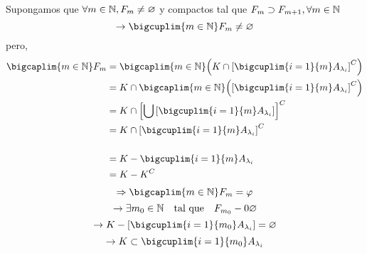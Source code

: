   Supongamos que $\forall m \in \mathbb{N}, F_m \neq \varnothing $ y compactos tal que $F_m \supset F_{m+1}, \forall m \in \mathbb{N}$
  $$
  \rightarrow \bigcuplim{m \in \N} F_m  \neq \varnothing
  $$
  pero, 
  \begin{align*}
  	\bigcaplim{m \in \N} F_m & = \bigcaplim{m \in \N} \pqty{K \cap  \bqty{\bigcuplim{i = 1}{m} A_{\lambda_i}}^C }\\
  	 &=K \cap \bigcaplim{m \in \N} \pqty{   \bqty{\bigcuplim{i = 1}{m} A_{\lambda_i}}^C }\\
  	 &=K \cap   \bqty{ \bigcup   \bqty{\bigcuplim{i = 1}{m} A_{\lambda_i}} }^C\\
  	 &=K \cap   \bqty{    \bigcuplim{i = 1}{m} A_{\lambda_i} }^C\\\\
  	 &=K - \bigcuplim{i = 1}{m} A_{\lambda_i} \\
  	 & = K-K^C\\
  \end{align*}
  $$
  \Rightarrow \bigcaplim{m \in \N} F_m = \varphi
  $$
  $$
  \rightarrow \exists m_0 \in \mathbb{N} \quad \text{tal que}\quad F_{m_0} -0 \varnothing
  $$
  $$
  \rightarrow K- \bqty{\bigcuplim{i = 1}{m_0} A_{\lambda_i}} = \varnothing
  $$
  $$
  \rightarrow K \subset \bigcuplim{i = 1}{m_0}  A_{\lambda_i}
  $$
  
  \thmrpf{}{}{}{}
  